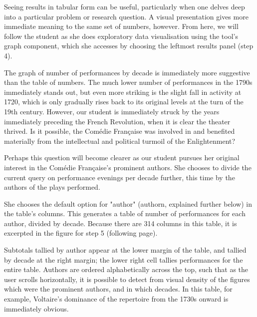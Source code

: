 \documentclass[	DIV=calc,%
							paper=a4,%
							fontsize=11pt,%
							twocolumn]{scrartcl}	 					%
\begin{document}
Seeing results in tabular form can be useful, particularly when one delves deep into a particular problem or research question.  A visual presentation gives more immediate meaning to the same set of numbers, however.  From here, we will follow the student as she does exploratory data visualisation using the tool’s graph component, which she accesses by choosing the leftmost results panel (step 4).

The graph of number of performances by decade is immediately more suggestive than the table of numbers.  The much lower number of performances in the 1790s immediately stands out, but even more striking is the slight fall in activity at 1720, which is only gradually rises back to its original levels at the turn of the 19th century.  However, our student is immediately struck by the years immediately preceding the French Revolution, when it is clear the theater thrived.  Is it possible, the Comédie Française was involved in and benefited materially from the intellectual and political turmoil of the Enlightenment?

Perhaps this question will become clearer as our student pursues her original interest in the Comédie Française’s prominent authors.  She chooses to divide the current query on performance evenings per decade further, this time by the authors of the plays performed.

She chooses the default option for "author" (authorn, explained further below) in the table’s columns.  This generates a table of number of performances for each author, divided by decade.  Because there are 314 columns in this table, it is excerpted in the figure for step 5 (following page).

Subtotals tallied by author appear at the lower margin of the table, and tallied by decade at the right margin; the lower right cell tallies performances for the entire table.  Authors are ordered alphabetically across the top, such that as the user scrolls horizontally, it is possible to detect from visual density of the figures which were the prominent authors, and in which decades.  In this table, for example, Voltaire’s dominance of the repertoire from the 1730s onward is immediately obvious.
\end{document}
